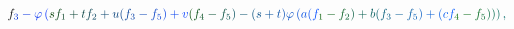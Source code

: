 \documentclass[12pt]{article}
\begin{document}
\begin{displaymath}
{f} _ { \mathcolor[RGB]{0,45,210}{3} } \mathcolor[RGB]{0,45,225}{-} \mathcolor[RGB]{0,45,240}{\varphi} \mathcolor[RGB]{0,45,255}{\left(} \mathcolor[RGB]{0,60,0}{s} \mathcolor[RGB]{0,60,15}{f} _ { \mathcolor[RGB]{0,60,30}{1} } \mathcolor[RGB]{0,60,45}{+} \mathcolor[RGB]{0,60,60}{t} \mathcolor[RGB]{0,60,75}{f} _ { \mathcolor[RGB]{0,60,90}{2} } \mathcolor[RGB]{0,60,105}{+} \mathcolor[RGB]{0,60,120}{u} \mathcolor[RGB]{0,60,135}{(} \mathcolor[RGB]{0,60,150}{f} _ { \mathcolor[RGB]{0,60,165}{3} } \mathcolor[RGB]{0,60,180}{-} \mathcolor[RGB]{0,60,195}{f} _ { \mathcolor[RGB]{0,60,210}{5} } \mathcolor[RGB]{0,60,225}{)} \mathcolor[RGB]{0,60,240}{+} \mathcolor[RGB]{0,60,255}{v} \mathcolor[RGB]{0,75,0}{(} \mathcolor[RGB]{0,75,15}{f} _ { \mathcolor[RGB]{0,75,30}{4} } \mathcolor[RGB]{0,75,45}{-} \mathcolor[RGB]{0,75,60}{f} _ { \mathcolor[RGB]{0,75,75}{5} } \mathcolor[RGB]{0,75,90}{)} \mathcolor[RGB]{0,75,105}{-} \mathcolor[RGB]{0,75,120}{(} \mathcolor[RGB]{0,75,135}{s} \mathcolor[RGB]{0,75,150}{+} \mathcolor[RGB]{0,75,165}{t} \mathcolor[RGB]{0,75,180}{)} \mathcolor[RGB]{0,75,195}{\varphi} \mathcolor[RGB]{0,75,210}{\left(} \mathcolor[RGB]{0,75,225}{a} \mathcolor[RGB]{0,75,240}{(} \mathcolor[RGB]{0,75,255}{f} _ { \mathcolor[RGB]{0,90,0}{1} } \mathcolor[RGB]{0,90,15}{-} \mathcolor[RGB]{0,90,30}{f} _ { \mathcolor[RGB]{0,90,45}{2} } \mathcolor[RGB]{0,90,60}{)} \mathcolor[RGB]{0,90,75}{+} \mathcolor[RGB]{0,90,90}{b} \mathcolor[RGB]{0,90,105}{(} \mathcolor[RGB]{0,90,120}{f} _ { \mathcolor[RGB]{0,90,135}{3} } \mathcolor[RGB]{0,90,150}{-} \mathcolor[RGB]{0,90,165}{f} _ { \mathcolor[RGB]{0,90,180}{5} } \mathcolor[RGB]{0,90,195}{)} \mathcolor[RGB]{0,90,210}{+} \mathcolor[RGB]{0,90,225}{(} \mathcolor[RGB]{0,90,240}{c} \mathcolor[RGB]{0,90,255}{f} _ { \mathcolor[RGB]{0,105,0}{4} } \mathcolor[RGB]{0,105,15}{-} \mathcolor[RGB]{0,105,30}{f} _ { \mathcolor[RGB]{0,105,45}{5} } \mathcolor[RGB]{0,105,60}{)} \mathcolor[RGB]{0,105,75}{\right)} \mathcolor[RGB]{0,105,90}{\right)} \mathcolor[RGB]{0,105,105}{,} \mathcolor[RGB]{0,105,120}{\,
}
\end{displaymath}
\end{document}
